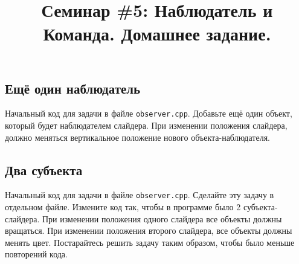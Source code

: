 \documentclass{article}
\begin{document}


\renewcommand{\thesubsection}{\arabic{subsection}}
\makeatletter
\def\@seccntformat#1{\@ifundefined{#1@cntformat}%
   {\csname the#1\endcsname\quad}%
   {\csname #1@cntformat\endcsname}}%
\newcommand\section@cntformat{}     %
\newcommand\subsection@cntformat{Задача \thesubsection.\space} %
\newcommand\subsubsection@cntformat{\thesubsubsection.\space} %
\makeatother

\title{Семинар \#5: Наблюдатель и Команда. Домашнее задание.\vspace{-5ex}}\date{}\maketitle


\subsection{Ещё один наблюдатель}
Начальный код для задачи в файле \texttt{observer.cpp}. Добавьте ещё один объект, который будет наблюдателем слайдера. При изменении положения слайдера, должно меняться вертикальное положение нового объекта-наблюдателя.


\subsection{Два субъекта}
Начальный код для задачи в файле \texttt{observer.cpp}. Сделайте эту задачу в отдельном файле.
Измените код так, чтобы в программе было 2 субъекта-слайдера. При изменении положения одного слайдера все объекты должны вращаться. При изменении положения второго слайдера, все объекты должны менять цвет. Постарайтесь решить задачу таким образом, чтобы было меньше повторений кода.
\end{document}
